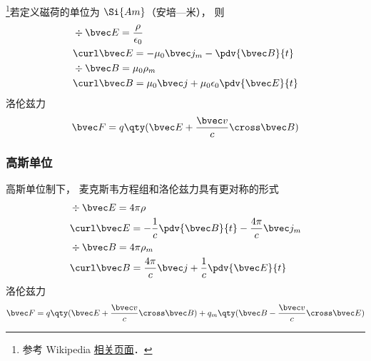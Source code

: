 
\begin{issues}
\issueAbstract
\end{issues}


\footnote{参考 Wikipedia \href{https://en.wikipedia.org/wiki/Magnetic_monopole}{相关页面}．}若定义磁荷的单位为 $\Si{Am}$（安培—米）， 则
\begin{align}
&\div \bvec E = \frac{\rho}{\epsilon_0}\\
&\curl \bvec E = - \mu_0 \bvec j_m -\pdv{\bvec B}{t}\\
&\div \bvec B = \mu_0 \rho_m \\
&\curl \bvec B = \mu_0 \bvec j + \mu_0\epsilon_0 \pdv{\bvec E}{t}
\end{align}
洛伦兹力
\begin{equation}
\bvec F = q \qty(\bvec E + \frac{\bvec v}{c}\cross \bvec B)
\end{equation}

\subsubsection{高斯单位}
高斯单位制下， 麦克斯韦方程组和洛伦兹力具有更对称的形式
\begin{align}
&\div \bvec E = 4\pi\rho\\
&\curl \bvec E = -\frac{1}{c}\pdv{\bvec B}{t}  - \frac{4\pi}{c}\bvec j_m\\
&\div \bvec B = 4\pi\rho_m \\
&\curl \bvec B = \frac{4\pi}{c} \bvec j + \frac{1}{c}\pdv{\bvec E}{t}
\end{align}
洛伦兹力
\begin{equation}
\bvec F = q \qty(\bvec E + \frac{\bvec v}{c}\cross \bvec B) + q_m \qty(\bvec B - \frac{\bvec v}{c}\cross \bvec E)
\end{equation}
